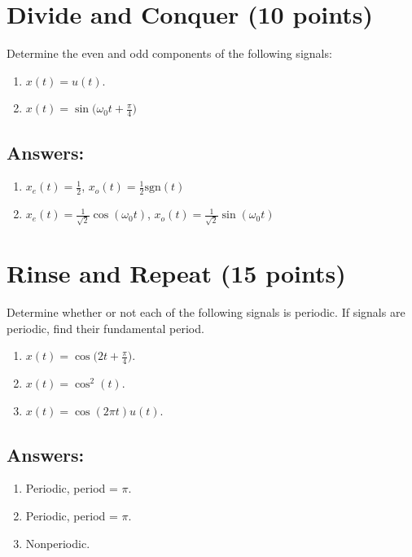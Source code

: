 \documentclass[12pt, xcolor=dvipsnames,svgnames,x11names]{article}
\newcommand{\showanswers}{no}
\begin{document}
\section{Divide and Conquer (10 points)}
Determine the even and odd components of the following signals:
\begin{enumerate}
    \item $x(t) = u(t)$.
    \item $x(t) = \sin\bigg({\omega_0 t + \frac{\pi}{4}}\bigg) $
\end{enumerate}

\ifthenelse{\equal{\showanswers}{yes}}
{
\subsection{Answers:}
\begin{enumerate}
    \item $x_e(t) = \frac{1}{2}$,  $x_o(t) = \frac{1}{2} \textrm{sgn}(t)$
    \item $x_e(t) = \frac{1}{\sqrt{2}} \cos(\omega_0 t)$, 
  $x_o(t) = \frac{1}{\sqrt{2}} \sin(\omega_0 t)$
\end{enumerate}
}

\section{Rinse and Repeat (15 points)}
Determine whether or not each of the following signals is periodic. If signals are periodic, find their fundamental period.

\begin{enumerate}
    \item $x(t) = \cos\bigg( 2t + \frac{\pi}{4}\bigg)$.
    \item $x(t) = \cos^2(t)$.
    \item $x(t) = \cos(2\pi t) u(t)$.
\end{enumerate}

\ifthenelse{\equal{\showanswers}{yes}}
{
\subsection{Answers:}
\begin{enumerate}
    \item Periodic, period = $\pi$.
    \item Periodic, period = $\pi$.
    \item Nonperiodic.
\end{enumerate}
}
\end{document}
